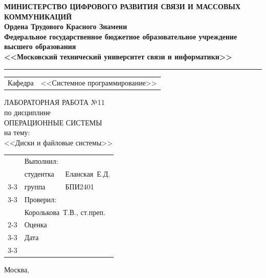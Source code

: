 \thispagestyle{empty}

\begin{center}
	\textbf{МИНИСТЕРСТВО ЦИФРОВОГО РАЗВИТИЯ СВЯЗИ И МАССОВЫХ КОММУНИКАЦИЙ} \\
	\textbf{Ордена Трудового Красного Знамени \\
		Федеральное государственное бюджетное образовательное учреждение высшего образования \\
		<<Московский технический университет связи и информатики>>}
\end{center}
\rule{\linewidth}{1pt}

\vspace{0.3em}

\begin{center}
	\begin{tabularx}{0.6\textwidth}{p{1.2cm}X}
		Кафедра & \quad <<Системное программирование>> \\%
	\end{tabularx}
\end{center}

\vspace{10em}

\begin{center}
	\Large
	ЛАБОРАТОРНАЯ РАБОТА №11 \\
	\large
	по дисциплине \\
	ОПЕРАЦИОННЫЕ СИСТЕМЫ \\
	на тему: \\
	<<Диски и файловые системы>>
\end{center}

\vspace{4em}

\renewcommand{\arraystretch}{1.1}
\begin{tabularx}{\textwidth}{p{10cm}p{2cm}p{3cm}}
	& Выполнил: & \\
	& студентка & Еланская~Е.Д. \\\cline{3-3} 
	& группа & БПИ2401 \\\cline{3-3} 
	& Проверил: &  \\
	& \multicolumn{2}{l}{Королькова~Т.В., ст.преп.} \\\cline{2-3}
	& Оценка & \\\cline{3-3} 
	& Дата & \\\cline{3-3} 
\end{tabularx}

\vspace{5em}

\begin{center}
	Москва,~\the\year
\end{center}
\clearpage

